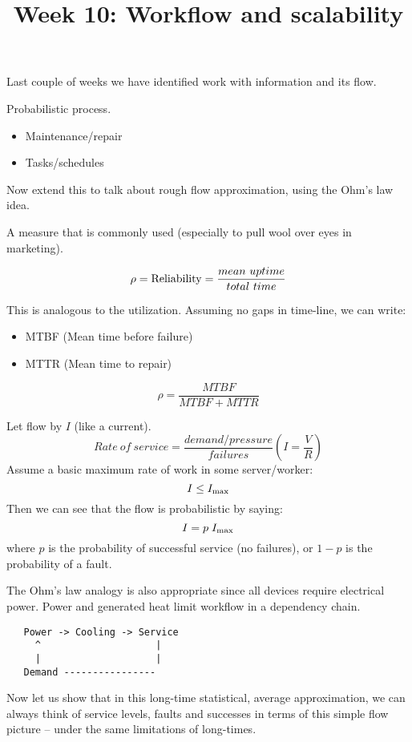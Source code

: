 \documentclass{slides}
\title{Week 10: Workflow and scalability}
\begin{document}
\maketitle





Last couple of weeks we have identified work with information and its flow.

Probabilistic process.

\begin{itemize}
\item Maintenance/repair
\item Tasks/schedules
\end{itemize}

Now extend this to talk about rough flow approximation, using the
Ohm's law idea.


A measure that is commonly used (especially to pull wool over eyes in marketing).

$$
\rho = {\rm Reliability} = \frac{mean~uptime}{total~time}
$$

This is analogous to the utilization. Assuming  no gaps in time-line, we can write:
\begin{itemize}
\item MTBF (Mean time before failure)
\item MTTR (Mean time to repair)
\end{itemize}
$$
\rho = \frac{MTBF}{MTBF+MTTR}
$$



Let flow by $I$ (like a current).
$$
Rate~ of~ service = \frac{demand/pressure}{failures} \left( I = \frac{V}{R}\right)
$$
Assume a basic maximum rate of work in some server/worker:
$$
I \le I_{\rm max}
$$
Then we can see that the flow is probabilistic by saying:
$$
I = p\; I_{\rm max}
$$
where $p$ is the probability of successful service (no failures), 
or $1-p$ is the probability of a fault.



The Ohm's law analogy is also appropriate since all devices require
electrical power. Power and generated heat limit workflow in a dependency
chain.
\begin{verbatim}
   Power -> Cooling -> Service 
     ^                    |
     |                    |
   Demand ----------------       
\end{verbatim}

Now let us show that in this long-time statistical, average approximation,
we can always think of service levels, faults and successes in terms of
this simple flow picture -- under the same limitations of long-times.
\end{document}
